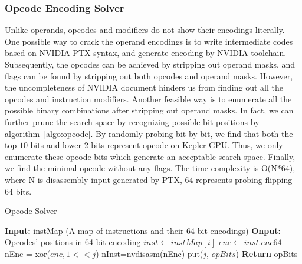 \subsubsection{Opcode Encoding Solver}
Unlike operands, opcodes and modifiers do not show their encodings literally. One possible way to crack the operand 
encodings is to write intermediate codes
based on NVIDIA PTX syntax, and generate encoding by NVIDIA toolchain.
Subsequently, the opcodes can be achieved by stripping out operand masks, and
flags can be found by stripping out both opcodes and operand masks.
However, the uncompleteness of NVIDIA document hinders us from finding out all the opcodes and instruction modifiers. 
Another feasible way is to enumerate all the possible binary combinations after stripping out operand masks.
In fact, we can further prune the search space by recognizing possible bit positions by algorithm~\ref{algo:opcode}. By 
randomly probing bit by bit, we find that both the top $10$ bits and lower $2$ bits represent opcode on Kepler GPU.
Thus, we only enumerate these opcode bits which generate an acceptable search space. Finally, we find 
the minimal opcode without any flags. The time complexity is O(N*64), where N
is disassembly input generated by PTX, $64$ represents probing flipping 64
bits.

\begin{algorithm}[htbp]
      \caption{Opcode Solver}\label{algo:opcode}
  \begin{algorithmic}[1]
      \State \textbf {Input:} instMap (A map of instructions and their 64-bit encodings)
      \State \textbf {Onput:} Opcodes' positions in 64-bit encoding
      \State $inst \gets instMap[i]$
      \State $enc \gets inst.enc64$
      \State nEnc = xor($enc, 1<<j$)
      \State nInst=nvdisasm(nEnc)
      \State put($j$, $opBits$)
      \EndIf
      \EndFor
      \EndFor
      \State \textbf{Return} opBits %
  \end{algorithmic}
\end{algorithm}

